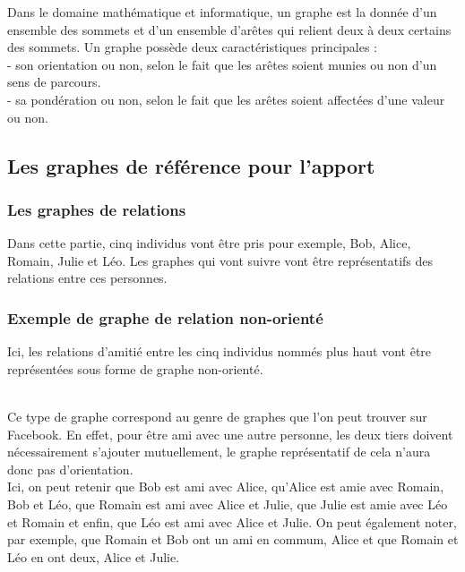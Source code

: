 \documentclass[12pt]{report}
\begin{document}
Dans le domaine mathématique et informatique, un graphe est la donnée d'un ensemble des sommets et d'un ensemble d'arêtes qui relient deux à deux certains des sommets. Un graphe possède deux caractéristiques principales : \\
- son orientation ou non, selon le fait que les arêtes soient munies ou non d'un sens de parcours.\\
- sa pondération ou non, selon le fait que les arêtes soient affectées d'une valeur ou non.

\subsection{Les graphes de référence pour l'apport}
\subsubsection{Les graphes de relations}
Dans cette partie, cinq individus vont être pris pour exemple, Bob, Alice, Romain, Julie et Léo. Les graphes qui vont suivre vont être représentatifs des relations entre ces personnes. 
\subsubsection{Exemple de graphe de relation non-orienté} 
Ici, les relations d'amitié entre les cinq individus nommés plus haut vont être représentées sous forme de graphe non-orienté. \\

\\

Ce type de graphe correspond au genre de graphes que l'on peut trouver sur Facebook. En effet, pour être ami avec une autre personne, les deux tiers doivent nécessairement s'ajouter mutuellement, le graphe représentatif de cela n'aura donc pas d'orientation.\\
Ici, on peut retenir que Bob est ami avec Alice, qu'Alice est amie avec Romain, Bob et Léo, que Romain est ami avec Alice et Julie, que Julie est amie avec Léo et Romain et enfin, que Léo est ami avec Alice et Julie. On peut également noter, par exemple, que Romain et Bob ont un ami en commum, Alice et que Romain et Léo en ont deux, Alice et Julie. 
\end{document}
